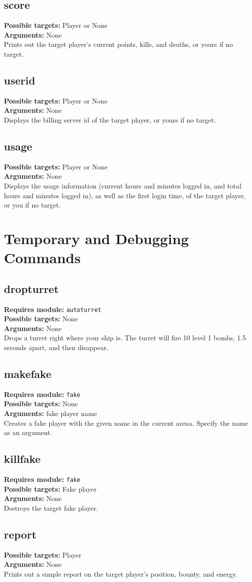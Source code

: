 \documentclass{article}
\newcommand{\requiremod}[1]{\noindent\textbf{Requires module:} \texttt{#1}\\}
\newcommand{\targets}[1]{\noindent\textbf{Possible targets:} #1\\}
\newcommand{\args}[1]{\noindent\textbf{Arguments:} #1\\}
\begin{document}
\subsection{score}  %
\targets{Player or None}
\args{None}
Prints out the target player's current points, kills, and deaths, or
yours if no target.

\subsection{userid}
\targets{Player or None}
\args{None}
Displays the billing server id of the target player, or yours if no
target.

\subsection{usage}
\targets{Player or None}
\args{None}
Displays the usage information (current hours and minutes logged in, and
total hours and minutes logged in), as well as the first login time, of
the target player, or you if no target.



\section{Temporary and Debugging Commands}

\subsection{dropturret}  %
\requiremod{autoturret}
\targets{None}
\args{None}
Drops a turret right where your ship is. The turret will fire 10 level 1
bombs, 1.5 seconds apart, and then disappear.

\subsection{makefake}  %
\requiremod{fake}
\targets{None}
\args{fake player name}
Creates a fake player with the given name in the current arena. Specify
the name as an argument.

\subsection{killfake}  %
\requiremod{fake}
\targets{Fake player}
\args{None}
Destroys the target fake player.

\subsection{report}  %
\targets{Player}
\args{None}
Prints out a simple report on the target player's position, bounty, and
energy.
\end{document}
